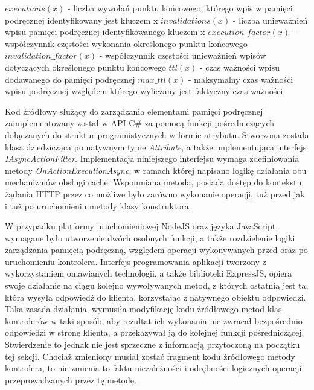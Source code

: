 $executions(x)$ - liczba wywołań punktu końcowego, którego wpis w pamięci podręcznej identyfikowany jest kluczem x \newline\newline
$invalidations(x)$ - liczba unieważnień wpisu pamięci podręcznej identyfikowanego kluczem x \newline\newline
$execution\_factor(x)$ - współczynnik częstości wykonania określonego punktu końcowego \newline\newline
$invalidation\_factor(x)$ - współczynnik częstości unieważnień wpisów dotyczących określonego punktu końcowego \newline\newline
$ttl(x)$ - czas ważności wpisu dodawanego do pamięci podręcznej \newline\newline
$max\_ttl(x)$ - maksymalny czas ważności wpisu podręcznej względem którego wyliczany jest faktyczny czas ważności \newline\newline

Kod źródłowy służący do zarządzania elementami pamięci podręcznej zaimplementowany został w API C\# za pomocą funkcji pośredniczących dołączanych do struktur programistycznych w formie atrybutu. Stworzona została klasa dziedzicząca po natywnym typie \textit{Attribute}, a także implementująca interfejs \textit{IAsyncActionFilter}. Implementacja niniejszego interfejsu wymaga zdefiniowania metody \textit{OnActionExecutionAsync}, w ramach której napisano logikę działania obu mechanizmów obsługi cache. Wspomniana metoda, posiada dostęp do kontekstu żądania HTTP przez co możliwe było zarówno wykonanie operacji, tuż przed jak i tuż po uruchomieniu metody klasy konstruktora.

W przypadku platformy uruchomieniowej NodeJS oraz języka JavaScript, wymagane było utworzenie dwóch osobnych funkcji, a także rozdzielenie logiki zarządzania pamięcią podręczną, względem operacji wykonywanych przed oraz po uruchomieniu kontrolera. Interfejs programowania aplikacji tworzony z wykorzystaniem omawianych technologii, a także biblioteki ExpressJS, opiera swoje działanie na ciągu kolejno wywoływanych metod, z których ostatnią jest ta, która wysyła odpowiedź do klienta, korzystając z natywnego obiektu odpowiedzi. Taka zasada działania, wymusiła modyfikację kodu źródłowego metod klas kontrolerów w taki sposób, aby rezultat ich wykonania nie zwracał bezpośrednio odpowiedzi w stronę klienta, a przekazywał ją do kolejnej funkcji pośredniczącej. Stwierdzenie to jednak nie jest sprzeczne z informacją przytoczoną na początku tej sekcji. Chociaż zmieniony musiał zostać fragment kodu źródłowego metody kontrolera, to nie zmienia to faktu niezależności i odrębności logicznych operacji przeprowadzanych przez tę metodę.

